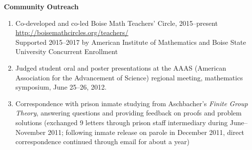 \documentclass[12pt]{article}
\begin{document}
\textbf{Community Outreach}
\begin{enumerate}
\item Co-developed and co-led Boise Math Teachers' Circle, 2015--present \\
\url{http://boisemathcircles.org/teachers/} \\
Supported 2015--2017 by American Institute of Mathematics and Boise State University Concurrent Enrollment

\item Judged student oral and poster presentations
at the AAAS (American Association for the Advancement of Science)
regional meeting, mathematics symposium,
June 25--26, 2012.

\item Correspondence with prison inmate studying from Aschbacher's \textit{Finite Group Theory},
answering questions and providing feedback on proofs and problem solutions
(exchanged 9 letters through prison staff intermediary during June--November 2011;
following inmate release on parole in December 2011, direct correspondence continued through email for about a year)

\end{enumerate}
\end{document}
